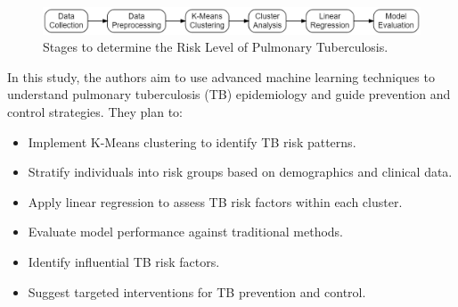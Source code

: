\documentclass[conference]{IEEEtran}
\begin{document}
\begin{figure}[H]
    \centerline{\includegraphics[width=\linewidth]{fig1.png}}
    \caption{Stages to determine the Risk Level of Pulmonary Tuberculosis.}
    \label{fig1}
\end{figure}

In this study, the authors aim to use advanced machine learning techniques to understand pulmonary tuberculosis (TB) epidemiology and guide prevention and control strategies. They plan to:
\begin{itemize}
    \item Implement K-Means clustering to identify TB risk patterns.
    \item Stratify individuals into risk groups based on demographics and clinical data.
    \item Apply linear regression to assess TB risk factors within each cluster.
    \item Evaluate model performance against traditional methods.
    \item Identify influential TB risk factors.
    \item Suggest targeted interventions for TB prevention and control.
\end{itemize}
\end{document}
